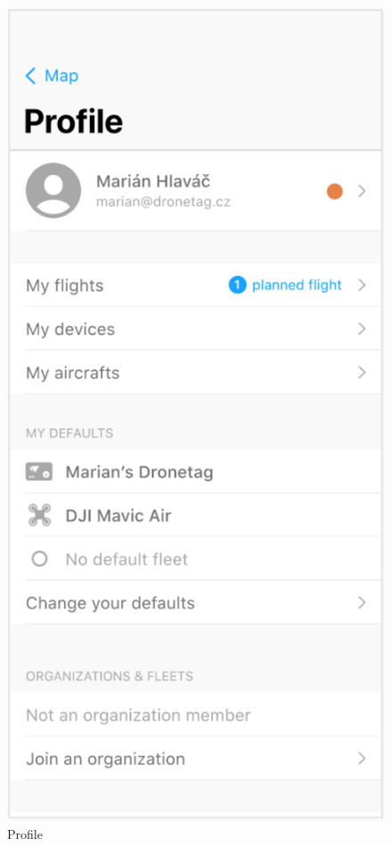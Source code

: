 \begin{figure}
\begin{minipage}{.4\textwidth}
        \includegraphics[width=.7\linewidth]{assets/user_interface_design/profile/profile.png}
        \caption{Profile}
        \label{fig:profile}
    \end{minipage}
    \label{fig:profile_all}
\end{figure}
